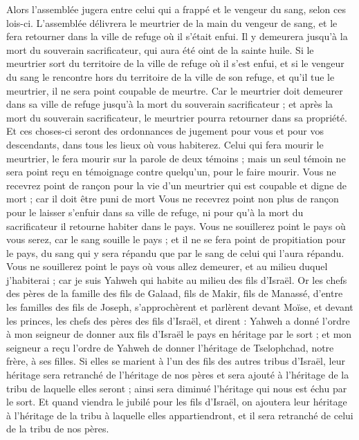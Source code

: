 \begin{multicols}{2}
Alors l'assemblée jugera entre celui qui a frappé et le vengeur du sang, selon ces lois-ci.
L'assemblée délivrera le meurtrier de la main du vengeur de sang, et le fera retourner dans la ville de refuge où il s'était enfui. Il y demeurera jusqu'à la mort du souverain sacrificateur, qui aura été oint de la sainte huile.
Si le meurtrier sort du territoire de la ville de refuge où il s'est enfui,
et si le vengeur du sang le rencontre hors du territoire de la ville de son refuge, et qu'il tue le meurtrier, il ne sera point coupable de meurtre.
Car le meurtrier doit demeurer dans sa ville de refuge jusqu'à la mort du souverain sacrificateur ; et après la mort du souverain sacrificateur, le meurtrier pourra retourner dans sa propriété.
Et ces choses-ci seront des ordonnances de jugement pour vous et pour vos descendants, dans tous les lieux où vous habiterez.
Celui qui fera mourir le meurtrier, le fera mourir sur la parole de deux témoins ; mais un seul témoin ne sera point reçu en témoignage contre quelqu'un, pour le faire mourir.
Vous ne recevrez point de rançon pour la vie d'un meurtrier qui est coupable et digne de mort ; car il doit être puni de mort
Vous ne recevrez point non plus de rançon pour le laisser s'enfuir dans sa ville de refuge, ni pour qu'à la mort du sacrificateur il retourne habiter dans le pays.
Vous ne souillerez point le pays où vous serez, car le sang souille le pays ; et il ne se fera point de propitiation pour le pays, du sang qui y sera répandu que par le sang de celui qui l'aura répandu.
Vous ne souillerez point le pays où vous allez demeurer, et au milieu duquel j'habiterai ; car je suis Yahweh qui habite au milieu des fils d'Israël.
\VerseOne{}Or les chefs des pères de la famille des fils de Galaad, fils de Makir, fils de Manassé, d'entre les familles des fils de Joseph, s'approchèrent et parlèrent devant Moïse, et devant les princes, les chefs des pères des fils d'Israël,
et dirent : Yahweh a donné l'ordre à mon seigneur de donner aux fils d'Israël le pays en héritage par le sort ; et mon seigneur a reçu l'ordre de Yahweh de donner l'héritage de Tselophchad, notre frère, à ses filles.
Si elles se marient à l'un des fils des autres tribus d'Israël, leur héritage sera retranché de l'héritage de nos pères et sera ajouté à l'héritage de la tribu de laquelle elles seront ; ainsi sera diminué l'héritage qui nous est échu par le sort.
Et quand viendra le jubilé pour les fils d'Israël, on ajoutera leur héritage à l'héritage de la tribu à laquelle elles appartiendront, et il sera retranché de celui de la tribu de nos pères.

\end{multicols}
